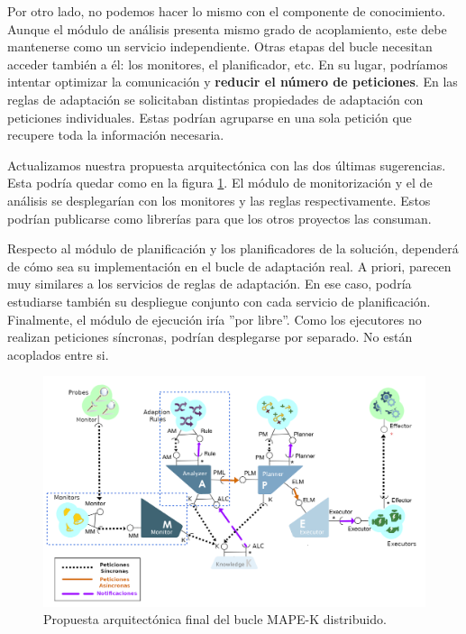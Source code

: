 Por otro lado, no podemos hacer lo mismo con el componente de conocimiento. Aunque el módulo de análisis presenta mismo grado de acoplamiento, este debe mantenerse como un servicio independiente. Otras etapas del bucle necesitan acceder también a él: los monitores, el planificador, etc. En su lugar, podríamos intentar optimizar la comunicación y \textbf{reducir el número de peticiones}. En las reglas de adaptación se solicitaban distintas propiedades de adaptación con peticiones individuales. Estas podrían agruparse en una sola petición que recupere toda la información necesaria.

Actualizamos nuestra propuesta arquitectónica con las dos últimas sugerencias. Esta podría quedar como en la figura \ref{fig:arquitectura-final}. El módulo de monitorización y el de análisis se desplegarían con los monitores y las reglas respectivamente. Estos podrían publicarse como librerías para que los otros proyectos las consuman.

Respecto al módulo de planificación y los planificadores de la solución, dependerá de cómo sea su implementación en el bucle de adaptación real. A priori, parecen muy similares a los servicios de reglas de adaptación. En ese caso, podría estudiarse también su despliegue conjunto con cada servicio de planificación. Finalmente, el módulo de ejecución iría ''por libre''. Como los ejecutores no realizan peticiones síncronas, podrían desplegarse por separado. No están acoplados entre si.

\begin{landscape}

  \begin{figure}[h!]
    \centering
    \includegraphics[scale=0.74]{cap_despliegue/images/arquitectura-final}
    \caption{Propuesta arquitectónica final del bucle MAPE-K distribuido.}
    \label{fig:arquitectura-final}
  \end{figure}

\end{landscape}

